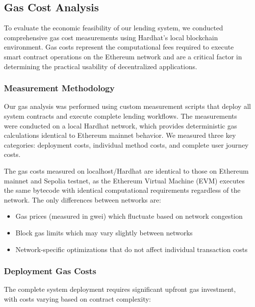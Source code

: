 \subsection{Gas Cost Analysis}

To evaluate the economic feasibility of our lending system, we conducted comprehensive gas cost measurements using Hardhat's local blockchain environment. Gas costs represent the computational fees required to execute smart contract operations on the Ethereum network and are a critical factor in determining the practical usability of decentralized applications.

\subsubsection{Measurement Methodology}

Our gas analysis was performed using custom measurement scripts that deploy all system contracts and execute complete lending workflows. The measurements were conducted on a local Hardhat network, which provides deterministic gas calculations identical to Ethereum mainnet behavior. We measured three key categories: deployment costs, individual method costs, and complete user journey costs.

The gas costs measured on localhost/Hardhat are identical to those on Ethereum mainnet and Sepolia testnet, as the Ethereum Virtual Machine (EVM) executes the same bytecode with identical computational requirements regardless of the network. The only differences between networks are:
\begin{itemize}
    \item Gas prices (measured in gwei) which fluctuate based on network congestion
    \item Block gas limits which may vary slightly between networks
    \item Network-specific optimizations that do not affect individual transaction costs
\end{itemize}

\subsubsection{Deployment Gas Costs}

The complete system deployment requires significant upfront gas investment, with costs varying based on contract complexity:

